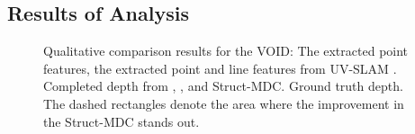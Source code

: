 \subsection{Results \textcolor{color1}{of} Analysis}\label{sec:exp_main}
\begin{figure}[t]
    \centering
    \caption{
        Qualitative comparison results for the VOID: 
         The extracted point features, 
         the extracted point and line features from UV-SLAM \cite{uvslsam}.
        Completed depth from 
         \cite{void}, 
         \cite{baseline}, and
         Struct-MDC.
         Ground truth depth. 
        The dashed rectangles denote the area where the improvement in the Struct-MDC stands out. 
    }
    \label{fig:void_result}
    \vspace{-0.3cm}
\end{figure}
